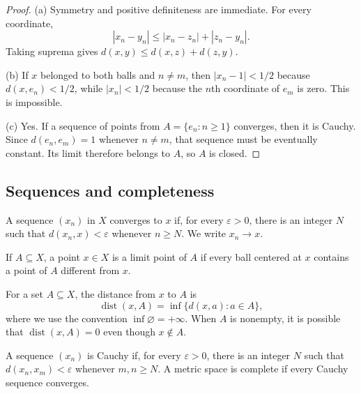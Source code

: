 \begin{proof}
(a) Symmetry and positive definiteness are immediate. For every coordinate,
\[
|x_n-y_n|\leq |x_n-z_n|+|z_n-y_n|.
\]
Taking suprema gives $d(x,y)\leq d(x,z)+d(z,y)$.

(b) If $x$ belonged to both balls and $n\neq m$, then
$|x_n-1|<1/2$ because $d(x,e_n)<1/2$, while $|x_n|<1/2$ because the $n$th
coordinate of $e_m$ is zero. This is impossible.

(c) Yes. If a sequence of points from $A=\{e_n:n\geq1\}$ converges, then it is
Cauchy. Since $d(e_n,e_m)=1$ whenever $n\neq m$, that sequence must be
eventually constant. Its limit therefore belongs to $A$, so $A$ is closed.
\end{proof}

\subsection{Sequences and completeness}

\begin{de}
A sequence $(x_n)$ in $X$ converges to $x$ if, for every $\varepsilon>0$,
there is an integer $N$ such that $d(x_n,x)<\varepsilon$ whenever $n\geq N$.
We write $x_n\to x$.

If $A\subseteq X$, a point $x\in X$ is a limit point of $A$ if every ball
centered at $x$ contains a point of $A$ different from $x$.

For a set $A\subseteq X$, the distance from $x$ to $A$ is
\[
\operatorname{dist}(x,A)=\inf\{d(x,a):a\in A\},
\]
where we use the convention $\inf\varnothing=+\infty$. When $A$ is
nonempty, it is possible that $\operatorname{dist}(x,A)=0$ even though
$x\notin A$.

A sequence $(x_n)$ is Cauchy if, for every $\varepsilon>0$, there is an
integer $N$ such that $d(x_n,x_m)<\varepsilon$ whenever $m,n\geq N$. A metric
space is complete if every Cauchy sequence converges.
\end{de}

